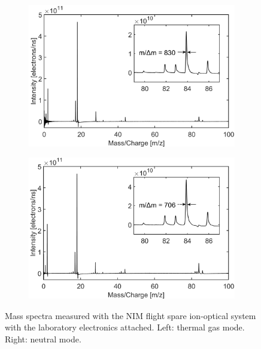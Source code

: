 		\begin{figure}[h!] %
			\begin{subfigure}{0.5\textwidth}
				\centering
				\includegraphics[width = .95\textwidth]{Experiments/FSLabthMode.png}
			\end{subfigure}
			\begin{subfigure}{0.5\textwidth}
				\centering
				\includegraphics[width = .95\textwidth]{Experiments/FSLabnMode.png}
			\end{subfigure}
			\caption{Mass spectra measured with the NIM flight spare ion-optical system with the laboratory electronics attached. Left: thermal gas mode. Right: neutral mode.}
			\label{fig:ExpFSFlightSenMassRes}
		\end{figure}
